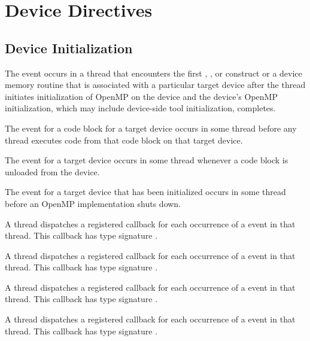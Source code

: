 \section{Device Directives}
\label{sec:Device Directives}

\subsection{Device Initialization}
\label{subsec:Device Initialization}

\events

The  event occurs in a thread that encounters the first 
, , or  construct 
or a device memory routine that 
is associated with a particular target device after the thread initiates 
initialization of OpenMP on the device and the device's OpenMP initialization, 
which may include device-side tool initialization, completes.

The  event for a code block for a target device occurs in some 
thread before any thread executes code from that code block on that target device.

The  event for a target device occurs in some thread
whenever a code block is unloaded from the device.

The  event for a target device that has been initialized
occurs in some thread before an OpenMP implementation shuts down.

\tools

A thread dispatches a registered 
callback for each occurrence of a  event in that 
thread.  This callback has type signature .

A thread dispatches a registered  callback 
for each occurrence of a  event in that thread. This callback 
has type signature .

A thread dispatches a registered 
callback for each occurrence of a  event in
that thread.  This callback has type signature
.

A thread dispatches a registered 
callback for each occurrence of a  event in
that thread.  This callback has type signature
.

